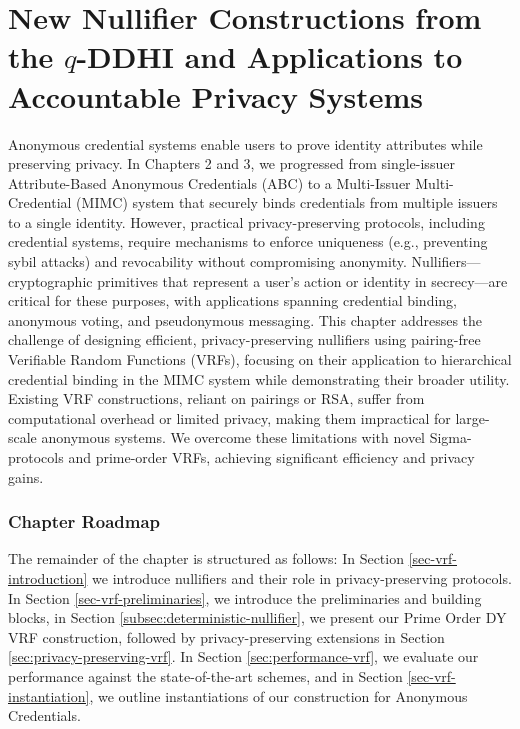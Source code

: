 \chapter{New Nullifier Constructions from the $q$-DDHI and Applications to Accountable Privacy Systems }\label{chap4}
Anonymous credential systems enable users to prove identity attributes while preserving privacy. In Chapters 2 and 3, we progressed from single-issuer Attribute-Based Anonymous Credentials (ABC) to a Multi-Issuer Multi-Credential (MIMC) system that securely binds credentials from multiple issuers to a single identity. However, practical privacy-preserving protocols, including credential systems, require mechanisms to enforce uniqueness (e.g., preventing sybil attacks) and revocability without compromising anonymity. Nullifiers—cryptographic primitives that represent a user’s action or identity in secrecy—are critical for these purposes, with applications spanning credential binding, anonymous voting, and pseudonymous messaging. This chapter addresses the challenge of designing efficient, privacy-preserving nullifiers using pairing-free Verifiable Random Functions (VRFs), focusing on their application to hierarchical credential binding in the MIMC system while demonstrating their broader utility. Existing VRF constructions, reliant on pairings or RSA, suffer from computational overhead or limited privacy, making them impractical for large-scale anonymous systems. We overcome these limitations with novel Sigma-protocols and prime-order VRFs, achieving significant efficiency and privacy gains.

\subsection*{Chapter Roadmap}
The remainder of the chapter is structured as follows: In Section \ref{sec-vrf-introduction} we introduce nullifiers and their role in privacy-preserving protocols. In Section \ref{sec-vrf-preliminaries}, we introduce the preliminaries and building blocks, in Section \ref{subsec:deterministic-nullifier}, we present our Prime Order DY VRF construction, followed by privacy-preserving extensions in Section \ref{sec:privacy-preserving-vrf}. In Section \ref{sec:performance-vrf}, we evaluate our performance against the state-of-the-art schemes, and in Section \ref{sec-vrf-instantiation}, we outline instantiations of our construction for Anonymous Credentials. 

